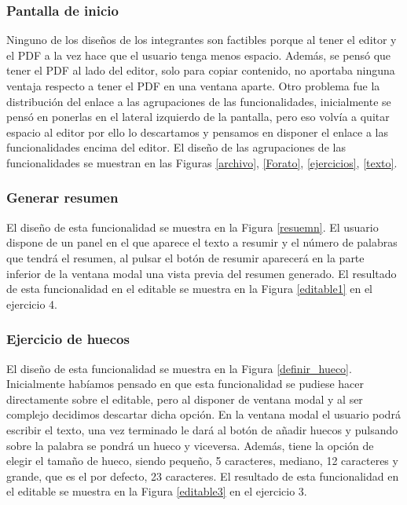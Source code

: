 \subsubsection{Pantalla de inicio}
Ninguno de los diseños de los integrantes son factibles porque al tener el editor y el PDF a la vez hace que el usuario tenga menos espacio. Además, se pensó que tener el PDF al lado del editor, solo para copiar contenido, no aportaba ninguna ventaja respecto a tener el PDF en una ventana aparte. Otro problema fue la distribución del enlace a las agrupaciones de las funcionalidades, inicialmente se pensó en ponerlas en el lateral izquierdo de la pantalla, pero eso volvía a quitar espacio al editor por ello lo descartamos y pensamos en disponer el enlace a las funcionalidades encima del editor. El diseño de las agrupaciones de las funcionalidades se muestran en las Figuras \ref{archivo}, \ref{Forato}, \ref{ejercicios}, \ref{texto}.

\subsubsection{Generar resumen}
El diseño de esta funcionalidad se muestra en la Figura \ref{resuemn}. El usuario dispone de un panel en el que aparece el texto a resumir y el número de palabras que tendrá el resumen, al pulsar el botón de resumir aparecerá en la parte inferior de la ventana modal una vista previa del resumen generado. El resultado de esta funcionalidad en el editable se muestra en la Figura \ref{editable1} en el ejercicio 4.

\subsubsection{Ejercicio de huecos}
El diseño de esta funcionalidad se muestra en la Figura \ref{definir_hueco}. Inicialmente habíamos pensado en que esta funcionalidad se pudiese hacer directamente sobre el editable, pero al disponer de ventana modal y al ser complejo decidimos descartar dicha opción. En la ventana modal el usuario podrá escribir el texto, una vez terminado le dará al botón de añadir huecos y pulsando sobre la palabra se pondrá un hueco y viceversa. Además, tiene la opción de elegir el tamaño de hueco, siendo pequeño, 5 caracteres, mediano, 12 caracteres y grande, que es el por defecto, 23 caracteres. El resultado de esta funcionalidad en el editable se muestra en la Figura \ref{editable3} en el ejercicio 3.

